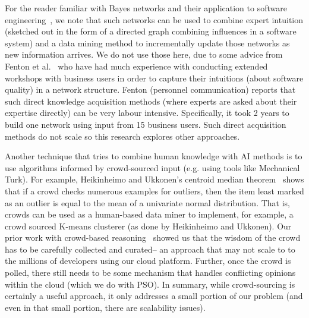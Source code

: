  
For the reader familiar with Bayes networks and their application to software engineering~\cite{hearty2009predicting,okutan2014software,misirli2014bayesian,dejaeger2013toward},
we note that such networks can be used to combine expert intuition (sketched out in the form of
a directed graph combining influences in a software system) and a data mining
method to incrementally update those networks as new information arrives. We do not use those here, due to some advice from Fenton et al.~\cite{hearty2009predicting} who have had much
experience with conducting extended workshops with business users in order to capture their intuitions (about software quality)
in a network structure. 
 Fenton (personnel communication)  reports that such direct knowledge acquisition methods (where experts
are asked about their expertise directly) can be very labour intensive. Specifically, it took 2 years to build one network 
using input from 15 business users. Such direct acquisition methods do not scale so this research explores other approaches.

Another technique that tries to combine human knowledge with AI methods is to use algorithms informed by crowd-sourced input (e.g.
using tools like Mechanical Turk).
For example, Heikinheimo and Ukkonen’s
centroid median theorem~\cite{HeikinheimoU13} shows that if a
crowd checks numerous examples for outliers,
then the item least marked as an outlier is equal to the mean of a univariate normal distribution.  That
is, crowds can be used as a human-based data miner to implement, for example, a crowd sourced K-means
clusterer (as done by Heikinheimo and Ukkonen).  Our prior work with crowd-based reasoning~\cite{chen2017replicating} showed us that
the wisdom of the crowd has to be carefully collected and curated-- an approach that may not scale to to the millions of
developers using our cloud platform. Further, once the crowd is polled, there still needs to be some mechanism that handles conflicting
opinions within the cloud (which we do with PSO). In summary, while crowd-sourcing is certainly a useful approach, it only addresses
a small portion of our problem (and even in that small portion, there are scalability issues).

